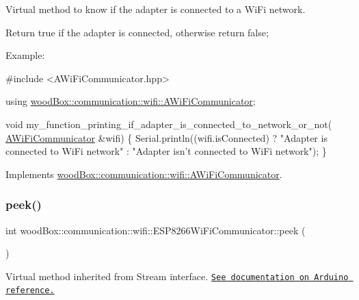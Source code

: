 Virtual method to know if the adapter is connected to a Wi\+Fi network.

Return true if the adapter is connected, otherwise return false;

Example\+:


\begin{DoxyCode}
\textcolor{preprocessor}{#include <AWiFiCommunicator.hpp>}

\textcolor{keyword}{using} \mbox{\hyperlink{classwood_box_1_1communication_1_1wifi_1_1_a_wi_fi_communicator}{woodBox::communication::wifi::AWiFiCommunicator}};

\textcolor{keywordtype}{void} my\_function\_printing\_if\_adapter\_is\_connected\_to\_network\_or\_not(
      \mbox{\hyperlink{classwood_box_1_1communication_1_1wifi_1_1_a_wi_fi_communicator_a9d1dc13ca9243170b04211bef2b86ed2}{AWiFiCommunicator}} &wifi) \{
  Serial.println((wifi.isConnected) ? \textcolor{stringliteral}{"Adapter is connected to WiFi network"} : \textcolor{stringliteral}{"Adapter isn't connected to
       WiFi network"});
\}
\end{DoxyCode}
 

Implements \mbox{\hyperlink{classwood_box_1_1communication_1_1wifi_1_1_a_wi_fi_communicator_afe42af0100dd483564995b8fc54b2e71}{wood\+Box\+::communication\+::wifi\+::\+A\+Wi\+Fi\+Communicator}}.

\mbox{\label{classwood_box_1_1communication_1_1wifi_1_1_e_s_p8266_wi_fi_communicator_accc6832fa7351cb977b9e3a805dc8107}} 
\subsubsection{\texorpdfstring{peek()}{peek()}}
{\footnotesize\ttfamily int wood\+Box\+::communication\+::wifi\+::\+E\+S\+P8266\+Wi\+Fi\+Communicator\+::peek (\begin{DoxyParamCaption}{ }\end{DoxyParamCaption})\hspace{0.3cm}{\ttfamily [virtual]}}

Virtual method inherited from Stream interface. \href{https://www.arduino.cc/reference/en/language/functions/communication/stream/streampeek/}{\tt See documentation on Arduino reference.} 

